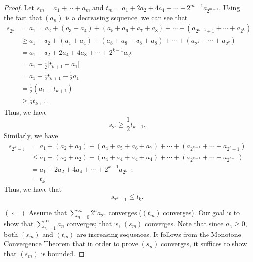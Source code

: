 \documentclass[a4paper]{article}
\begin{document}
\begin{proof}
Let \( {s}_{m} = {a}_{1} + \cdots + {a}_{m} \) and \( {t}_{m} = {a}_{1} + {2a}_{2} + {4a}_{4} + \cdots + 2^{m-1} {a}_{2^{m-1}} \). Using the fact that \(({a}_{n})\) is a decreasing sequence, we can see that
\begin{align*}
    {s}_{2^{k}} &= {a}_{1} = {a}_{2} + ({a}_{3} + {a}_{4}) + ({a}_{5} + {a}_{6} + {a}_{7} + {a}_{8}) + \cdots + ({a}_{2^{k-1} + 1} + \cdots + {a}_{2^{k}}) \\
                &\geq {a}_{1} + {a}_{2} + ({a}_{4} + {a}_{4}) + ({a}_{8} + {a}_{8} + {a}_{8} + {a}_{8}) + \cdots + ({a}_{2^{k}} + \cdots + {a}_{2^{k}}) \\
                &= {a}_{1} + {a}_{2} + 2 {a}_{4} + {4a}_{8} + \cdots + 2^{k-1} {a}_{2^{k}} \\
                &=  {a}_{1} + \frac{ 1 }{ 2 }  \Big[ {t}_{k+1} - {a}_{1} \Big] \\
                &= {a}_{1} + \frac{ 1 }{ 2 }  {t}_{k+1} - \frac{ 1 }{ 2 }  {a}_{1} \\
                &= \frac{ 1 }{ 2 }  ({a}_{1} + {t}_{k+1}) \\  
                &\geq \frac{ 1 }{ 2 }  {t}_{k+1}. 
\end{align*}
Thus, we have  
\[ {s}_{2^{k}} \geq \frac{ 1 }{ 2 }  {t}_{k+1}. \tag{*} \]
Similarly, we have
\begin{align*}
    {s}_{2^{k} - 1} &= {a}_{1} + ({a}_{2} + {a}_{3}) + ({a}_{4} + {a}_{5} + {a}_{6} + {a}_{7}) + \cdots + ({a}_{2^{k-1}} + \cdots + {a}_{2^{k} - 1}) \\
                    &\leq {a}_{1} + ({a}_{2} + {a}_{2}) + ({a}_{4} + {a}_{4} + {a}_{4} + {a}_{4}) + \cdots + ({a}_{2^{k-1}} + \cdots + {a}_{2^{k-1}}) \\ 
                    &= {a}_{1} + {2a}_{2} + {4a}_{4} + \cdots + 2^{k-1} {a}_{2^{k-1}}  \\
                    &= {t}_{k}.
\end{align*}
Thus, we have that 
\[  {s}_{2^{k } - 1} \leq {t}_{k}. \tag{**} \]

\( (\Longleftarrow) \) Assume that \( \sum_{ n=0  }^{ \infty  } 2^{n} {a}_{2^{n}} \) converges (\( ({t}_{m}) \) converges). Our goal is to show that \( \sum_{ n=1  }^{ \infty  } {a}_{n} \) converges; that is, \( ({s}_{m}) \) converges. Note that since \( {a}_{n} \geq 0  \), both \( ({s}_{m}) \) and \( ({t}_{m}) \) are increasing sequences. It follows from the Monotone Convergence Theorem that in order to prove \( ({s}_{n}) \) converges, it suffices to show that \( ({s}_{m}) \) is bounded. 


\end{proof}
\end{document}
